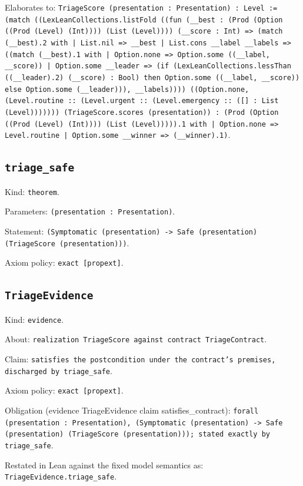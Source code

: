 \documentclass[11pt]{article}
\begin{document}
\noindent Elaborates to: \texttt{TriageScore (presentation : Presentation) : Level := (match ((LexLeanCollections.listFold ((fun (\_\_best : (Prod (Option ((Prod (Level) (Int)))) (List (Level)))) (\_\_score : Int) => (match (\_\_best).2 with | List.nil => \_\_best | List.cons \_\_label \_\_labels => ((match (\_\_best).1 with | Option.none => Option.some ((\_\_label, \_\_score)) | Option.some \_\_leader => (if (LexLeanCollections.lessThan ((\_\_leader).2) (\_\_score) : Bool) then Option.some ((\_\_label, \_\_score)) else Option.some (\_\_leader))), \_\_labels)))) ((Option.none, (Level.routine :: (Level.urgent :: (Level.emergency :: ([] : List (Level))))))) (TriageScore.scores (presentation)) : (Prod (Option ((Prod (Level) (Int)))) (List (Level))))).1 with | Option.none => Level.routine | Option.some \_\_winner => (\_\_winner).1)}.\par
\subsection*{\texttt{triage\_safe}}
\noindent Kind: \texttt{theorem}.\par
\noindent Parameters: \texttt{(presentation : Presentation)}.\par
\noindent Statement: \texttt{(Symptomatic (presentation) -> Safe (presentation) (TriageScore (presentation)))}.\par
\noindent Axiom policy: \texttt{exact [propext]}.\par
\subsection*{\texttt{TriageEvidence}}
\noindent Kind: \texttt{evidence}.\par
\noindent About: \texttt{realization TriageScore against contract TriageContract}.\par
\noindent Claim: \texttt{satisfies the postcondition under the contract's premises, discharged by triage\_safe}.\par
\noindent Axiom policy: \texttt{exact [propext]}.\par
\noindent Obligation (evidence TriageEvidence claim satisfies\_contract): \texttt{forall (presentation : Presentation), (Symptomatic (presentation) -> Safe (presentation) (TriageScore (presentation))); stated exactly by triage\_safe}.\par
\noindent Restated in Lean against the fixed model semantics as: \texttt{TriageEvidence.triage\_safe}.\par
\end{document}
